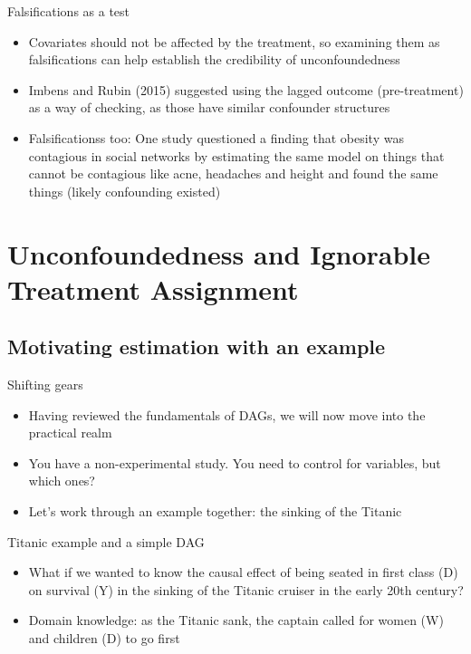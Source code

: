 \documentclass{beamer}
\begin{document}
\begin{frame}{Falsifications as a test}

\begin{itemize}
\item Covariates should not be affected by the treatment, so examining them as falsifications can help establish the credibility of unconfoundedness
\item Imbens and Rubin (2015) suggested using the lagged outcome (pre-treatment) as a way of checking, as those have similar confounder structures
\item Falsificationss too: One study questioned a finding that obesity was contagious in social networks by estimating the same model on things that cannot be contagious like acne, headaches and height and found the same things (likely confounding existed)
\end{itemize}

\end{frame}




\section{Unconfoundedness and Ignorable Treatment Assignment}

\subsection{Motivating estimation with an example}


\begin{frame}{Shifting gears}

\begin{itemize}
\item Having reviewed the fundamentals of DAGs, we will now move into the practical realm
\item You have a non-experimental study.  You need to control for variables, but which ones?
\item Let's work through an example together: the sinking of the Titanic
\end{itemize}

\end{frame}




\begin{frame}{Titanic example and a simple DAG}

\begin{itemize}

\item What if we wanted to know the causal effect of being seated in first class (D) on survival (Y) in the sinking of the Titanic cruiser in the early 20th century?  
\item Domain knowledge: as the Titanic sank, the captain called for women (W) and children (D) to go first

\end{itemize}

\end{frame}
\end{document}
